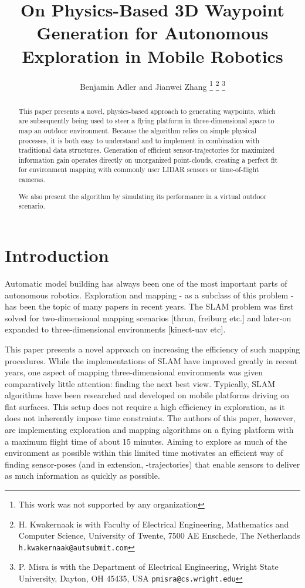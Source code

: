 \documentclass[a4paper, 10pt, conference]{ieeeconf}      %
\title{\LARGE \bf
On Physics-Based 3D Waypoint Generation for Autonomous Exploration in Mobile Robotics
}
\author{Benjamin Adler and Jianwei Zhang%
\thanks{This work was not supported by any organization}%
\thanks{H. Kwakernaak is with Faculty of Electrical Engineering, Mathematics and Computer Science,
        University of Twente, 7500 AE Enschede, The Netherlands
        {\tt\small h.kwakernaak@autsubmit.com}}%
\thanks{P. Misra is with the Department of Electrical Engineering, Wright State University,
        Dayton, OH 45435, USA
        {\tt\small pmisra@cs.wright.edu}}%
}
\begin{document}
\maketitle
\thispagestyle{empty}
\pagestyle{empty}



\begin{abstract}

This paper presents a novel, physics-based approach to generating waypoints, which are subsequently being used to steer a flying platform in three-dimensional space to map an outdoor environment. Because the algorithm relies on simple physical processes, it is both easy to understand and to implement in combination with traditional data structures. Generation of efficient sensor-trajectories for maximized information gain operates directly on unorganized point-clouds, creating a perfect fit for environment mapping with commonly user LIDAR sensors or time-of-flight cameras.

We also present the algorithm by simulating its performance in a virtual outdoor scenario.

\end{abstract}



\section{Introduction}

Automatic model building has always been one of the most important parts of autonomous robotics. Exploration and mapping - as a subclass of this problem - has been the topic of many papers in recent years. The SLAM problem was first solved for two-dimensional mapping scenarios [thrun, freiburg etc.] and later-on expanded to three-dimensional environments [kinect-uav etc].

This paper presents a novel approach on increasing the efficiency of such mapping procedures. While the implementations of SLAM have improved greatly in recent years, one aspect of mapping three-dimensional environments was given comparatively little attention: finding the next best view. Typically, SLAM algorithms have been researched and developed on mobile platforms driving on flat surfaces. This setup does not require a high efficiency in exploration, as it does not inherently impose time constraints. The authors of this paper, however, are implementing exploration and mapping algorithms on a flying platform with a maximum flight time of about 15 minutes. Aiming to explore as much of the environment as possible within this limited time motivates an efficient way of finding sensor-poses (and in extension, -trajectories) that enable sensors to deliver as much information as quickly as possible.
\end{document}
